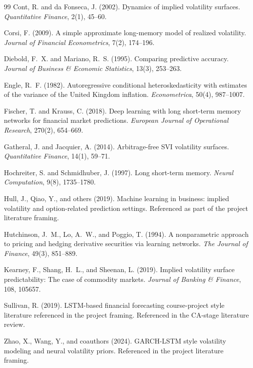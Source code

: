 \documentclass[12pt]{report}
\begin{document}
\begin{thebibliography}{99}
Cont, R. and da Fonseca, J. (2002).
\newblock Dynamics of implied volatility surfaces.
\newblock \emph{Quantitative Finance}, 2(1), 45--60.

Corsi, F. (2009).
\newblock A simple approximate long-memory model of realized volatility.
\newblock \emph{Journal of Financial Econometrics}, 7(2), 174--196.

Diebold, F.~X. and Mariano, R.~S. (1995).
\newblock Comparing predictive accuracy.
\newblock \emph{Journal of Business \& Economic Statistics}, 13(3), 253--263.

Engle, R.~F. (1982).
\newblock Autoregressive conditional heteroskedasticity with estimates of the variance of the United Kingdom inflation.
\newblock \emph{Econometrica}, 50(4), 987--1007.

Fischer, T. and Krauss, C. (2018).
\newblock Deep learning with long short-term memory networks for financial market predictions.
\newblock \emph{European Journal of Operational Research}, 270(2), 654--669.

Gatheral, J. and Jacquier, A. (2014).
\newblock Arbitrage-free SVI volatility surfaces.
\newblock \emph{Quantitative Finance}, 14(1), 59--71.

Hochreiter, S. and Schmidhuber, J. (1997).
\newblock Long short-term memory.
\newblock \emph{Neural Computation}, 9(8), 1735--1780.

Hull, J., Qiao, Y., and others (2019).
\newblock Machine learning in business: implied volatility and option-related prediction settings.
\newblock Referenced as part of the project literature framing.

Hutchinson, J.~M., Lo, A.~W., and Poggio, T. (1994).
\newblock A nonparametric approach to pricing and hedging derivative securities via learning networks.
\newblock \emph{The Journal of Finance}, 49(3), 851--889.

Kearney, F., Shang, H.~L., and Sheenan, L. (2019).
\newblock Implied volatility surface predictability: The case of commodity markets.
\newblock \emph{Journal of Banking \& Finance}, 108, 105657.

Sullivan, R. (2019).
\newblock LSTM-based financial forecasting course-project style literature referenced in the project framing.
\newblock Referenced in the CA-stage literature review.

Zhao, X., Wang, Y., and coauthors (2024).
\newblock GARCH-LSTM style volatility modeling and neural volatility priors.
\newblock Referenced in the project literature framing.

\end{thebibliography}
\end{document}
